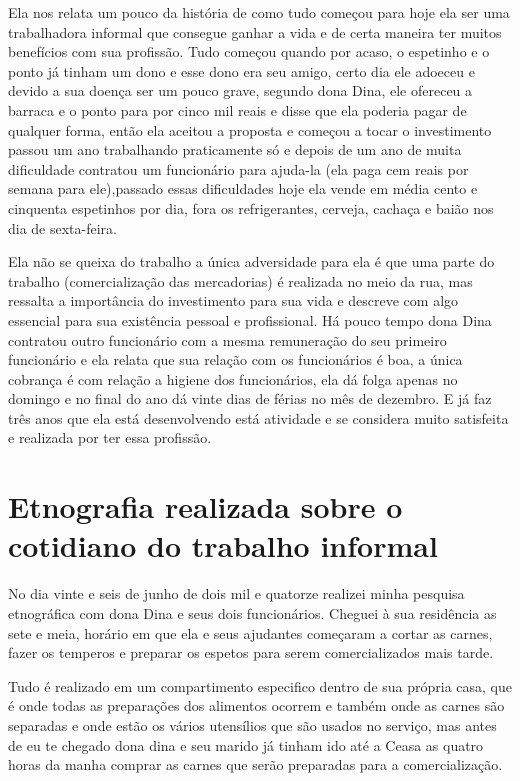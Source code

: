 Ela nos relata um pouco da história de como tudo começou para hoje 
ela ser uma trabalhadora informal que consegue ganhar a vida e de certa maneira 
ter muitos benefícios com sua profissão. Tudo começou quando por acaso, o 
espetinho e o ponto já tinham um dono e esse dono era seu amigo, certo dia ele 
adoeceu e devido a sua doença ser um pouco grave, segundo dona Dina, ele 
ofereceu a barraca e o ponto para por cinco mil reais e disse que ela poderia 
pagar de qualquer forma, então ela aceitou a proposta e começou a tocar o 
investimento passou um ano trabalhando praticamente só e depois de um ano de 
muita dificuldade contratou um funcionário para ajuda-la (ela paga cem reais por 
semana para ele),passado essas dificuldades hoje ela vende em média cento e 
cinquenta espetinhos por dia, fora os refrigerantes, cerveja, cachaça e baião 
nos dia de sexta-feira. 

Ela não se queixa do trabalho a única adversidade para 
ela é que uma parte do trabalho (comercialização das mercadorias) é realizada no 
meio da rua, mas ressalta a importância do investimento para sua vida e descreve 
com algo essencial para sua existência pessoal e profissional. Há pouco tempo 
dona Dina contratou outro funcionário com a mesma remuneração do seu primeiro 
funcionário e ela relata que sua relação com os funcionários é boa, a única 
cobrança é com relação a higiene dos funcionários, ela dá folga apenas no 
domingo e no final do ano dá vinte dias de férias no mês de dezembro. E já faz 
três anos que ela está desenvolvendo está atividade e se considera muito 
satisfeita e realizada por ter essa profissão.

\section{Etnografia realizada sobre o cotidiano do trabalho informal}

No dia vinte e seis de junho de dois mil e quatorze realizei minha pesquisa 
etnográfica com dona Dina e seus dois funcionários. Cheguei à sua residência as 
sete e meia, horário em que ela e seus ajudantes começaram a cortar as carnes, 
fazer os temperos e preparar os espetos para serem comercializados mais tarde. 

Tudo é realizado em um compartimento especifico dentro de sua própria casa, que 
é onde todas as preparações dos alimentos ocorrem e também onde as carnes são 
separadas e onde estão os vários utensílios que são usados no serviço, mas antes 
de eu te chegado dona dina e seu marido já tinham ido até a Ceasa as quatro 
horas da manha comprar as carnes que serão preparadas para a comercialização. 

